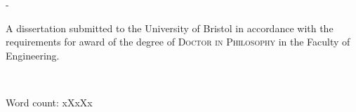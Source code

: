 \begin{titlingpage}
\begin{SingleSpace}
\begin{adjustwidth*}{\unitlength}{-\unitlength}
\begin{center}
\vspace{11mm}
\begin{minipage}{10cm}
\center A dissertation submitted to the University of Bristol in accordance with the requirements for award of the degree of \textsc{Doctor in Philosophy} in the Faculty of Engineering.
\end{minipage}\\
\vspace{9mm}
{\large\textsc{\monthyeardate}}
\vspace{12mm}
\end{center}
\begin{flushright}
{\small Word count: xXxXx}
\end{flushright}
\end{adjustwidth*}
\end{SingleSpace}
\end{titlingpage}